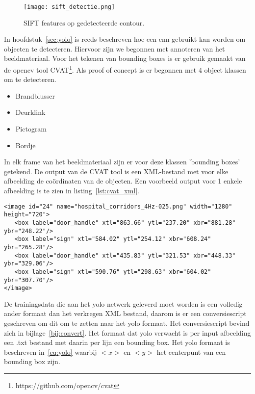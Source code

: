    \begin{figure}[!htb]
      \centering
      \texttt{[image: sift\_detectie.png]}
      \caption{SIFT features op gedetecteerde contour.}
      \label{fig:sift_detect}
   \end{figure}


   In hoofdstuk~\ref{sec:yolo} is reeds beschreven hoe een \gls{cnn} gebruikt kan worden om objecten te detecteren. Hiervoor zijn we begonnen met annoteren van het beeldmateriaal.
   Voor het tekenen van bounding boxes is er gebruik gemaakt van de opencv tool CVAT\footnote{https://github.com/opencv/cvat}. Als proof of concept is er begonnen met 4 object klassen om te detecteren.

   \begin{itemize}
      \item Brandblusser
      \item Deurklink
      \item Pictogram
      \item Bordje
   \end{itemize}

   In elk frame van het beeldmateriaal zijn er voor deze klassen 'bounding boxes' getekend. De output van de CVAT tool is een XML-bestand met voor elke afbeelding de co\"{o}rdinaten van de objecten.
   Een voorbeeld output voor 1 enkele afbeelding is te zien in listing~\ref{lst:cvat_xml}.

   \begin{lstlisting}
<image id="24" name="hospital_corridors_4Hz-025.png" width="1280" height="720">
   <box label="door_handle" xtl="863.66" ytl="237.20" xbr="881.28" ybr="248.22"/>
   <box label="sign" xtl="584.02" ytl="254.12" xbr="608.24" ybr="265.28"/>
   <box label="door_handle" xtl="435.83" ytl="321.53" xbr="448.33" ybr="329.06"/>
   <box label="sign" xtl="590.76" ytl="298.63" xbr="604.02" ybr="307.70"/>
</image>     
   \end{lstlisting}

   De trainingsdata die aan het \gls{yolo} netwerk geleverd moet worden is een volledig ander formaat dan het verkregen XML bestand, daarom is er een conversiescript geschreven om dit om te zetten naar het \gls{yolo} formaat.
   Het conversiescript bevind zich in bijlage~\ref{bij:convert}. 
   Het formaat dat \gls{yolo} verwacht is per input afbeelding een .txt bestand met daarin per lijn een bounding box. Het \gls{yolo} formaat is beschreven in~\ref{eq:yolo} waarbij $<x>$ en $<y>$ het centerpunt van een bounding box zijn.

